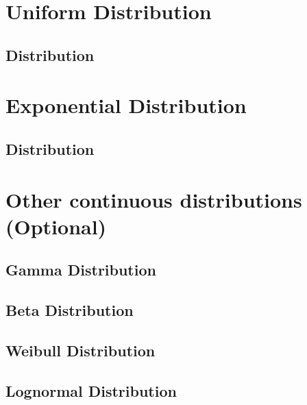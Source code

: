 \section{Uniform Distribution}  %
    \subsection{Distribution}  %

\section{Exponential Distribution}  %
    \subsection{Distribution}  %

\section{Other continuous distributions (Optional)}  %
    \subsection{Gamma Distribution}  %
    \subsection{Beta Distribution}  %
    \subsection{Weibull Distribution}  %
    \subsection{Lognormal Distribution}  %
